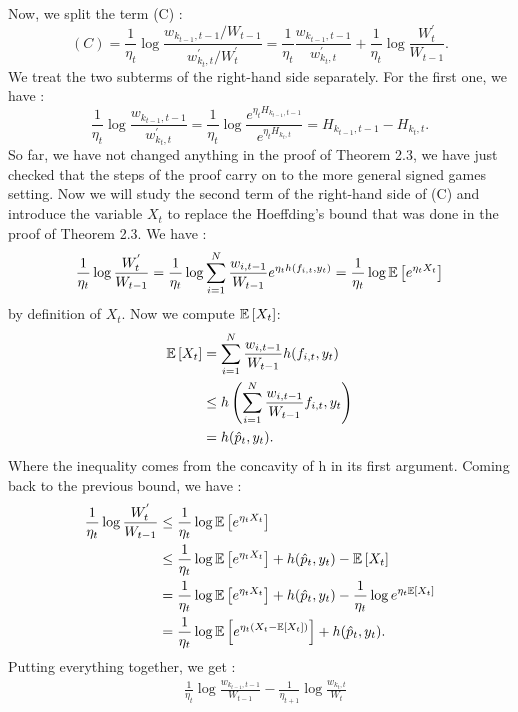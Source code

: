\begin{solution}[]
Now, we split the term (C) :
\begin{equation*}
	(C) = \frac{1}{\eta_t}\log \frac{w_{k_{t-1},t-1}/W_{t-1}}{w^{'}_{k_t,t}/W^{'}_t} = \frac{1}{\eta_t} \frac{w_{k_{t-1},t-1}}{w^{'}_{k_t,t}} + \frac{1}{\eta_t} \log \frac{W^{'}_t}{W_{t-1}}.
\end{equation*}
We treat the two subterms of the right-hand side separately. For the first one, we have :
\begin{equation*}
	\frac{1}{\eta_t} \log \frac{w_{k_{t-1},t-1}}{w^{'}_{k_t,t}} = \frac{1}{\eta_t} \log \frac{e^{\eta_t H_{k_{t-1},t-1}}}{e^{\eta_t H_{k_t,t}}} = H_{k_{t-1},t-1} - H_{k_t,t}.
\end{equation*}
So far, we have not changed anything in the proof of Theorem 2.3, we have just checked that the steps of the proof carry on to the more general signed games setting. Now we will study the second term of the right-hand side of (C) and introduce the variable $ X_t $ to replace the Hoeffding's bound that was done in the proof of Theorem 2.3. We have :
\begin{equation*}
	\frac{1}{\eta_t} \log \frac{W^{'}_t}{W_{t-1}} = \frac{1}{\eta_t}\log \sum_{i=1}^{N} \frac{w_{i,t-1}}{W_{t-1}}e^{\eta_t h(f_{i,t},y_t)} = \frac{1}{\eta_t} \log \mathbb{E}\left[e^{\eta_tX_t}\right]
\end{equation*}
by definition of $ X_t $. 
Now we compute $ \mathbb{E}\left[X_t\right] $:
\begin{align*}
	\mathbb{E}\left[X_t\right] &= \sum_{i=1}^{N}\frac{w_{i,t-1}}{W_{t-1}}h(f_{i,t},y_t)\\
		 &\leq h \left( \sum_{i=1}^{N}\frac{w_{i,t-1}}{W_{t-1}}f_{i,t},y_t \right)\\
		 &=h(\hat{p}_t,y_t).
\end{align*}
Where the inequality comes from the concavity of h in its first argument.
Coming back to the previous bound, we have :
\begin{align*}
	\frac{1}{\eta_t}\log \frac{W^{'}_t}{W_{t-1}}&\leq \frac{1}{\eta_t}\log \mathbb{E}\left[e^{\eta_tX_t}\right]\\
	&\leq \frac{1}{\eta_t}\log \mathbb{E}\left[e^{\eta_tX_t}\right] + h(\hat{p}_t,y_t) - \mathbb{E}\left[X_t\right]\\
	&= \frac{1}{\eta_t}\log \mathbb{E}\left[e^{\eta_tX_t}\right] + h(\hat{p}_t,y_t) - \frac{1}{\eta_t}\log e^{\eta_t\mathbb{E}\left[X_t\right]}\\
	&= \frac{1}{\eta_t}\log \mathbb{E}\left[e^{\eta_t(X_t-\mathbb{E}\left[X_t\right])}\right] + h(\hat{p}_t,y_t).
\end{align*}
Putting everything together, we get :
\begin{align*}
	&\frac{1}{\eta_t} \log \frac{w_{k_{t-1},t-1}}{W_{t-1}} - \frac{1}{\eta_{t+1}}\log \frac{w_{k_t,t}}{W_t}\\

\end{align*}
\end{solution}
